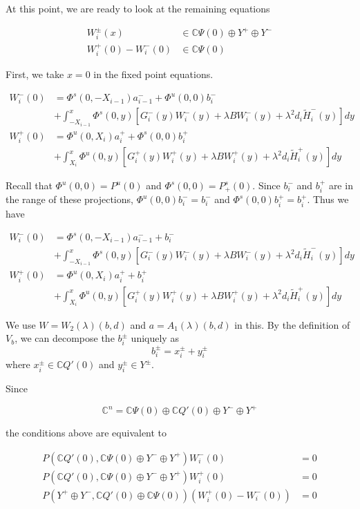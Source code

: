 \documentclass[12pt]{article}
\def\C{{\mathbb C}}
\begin{document}
At this point, we are ready to look at the remaining equations

\begin{align*}
W_i^\pm(x) &\in \C \Psi(0) \oplus Y^+ \oplus Y^- \\
W_i^+(0) - W_i^-(0) &\in \C \Psi(0) 
\end{align*}

First, we take $x = 0$ in the fixed point equations.

\begin{align*}
W_i^-(0) &= \Phi^s(0, -X_{i-1})a^-_{i-1} + \Phi^u(0, 0)b_i^- \\
&+ \int_{-X_{i-1}}^x \Phi^s(0, y)[G_i^-(y) W_i^-(y) + \lambda B W_i^-(y) + \lambda^2 d_i \tilde{H}_i^-(y)] dy \\
W_i^+(0) &= \Phi^u(0, X_i)a^+_{i} + \Phi^s(0, 0)b_i^+ \\
&+ \int_{X_{i}}^x \Phi^u(0, y)[G_i^+(y) W_i^+(y) + \lambda B W_i^+(y) + \lambda^2 d_i \tilde{H}_i^+(y) ] dy
\end{align*}

Recall that $\Phi^u(0, 0) = P^u(0)$ and $\Phi^s(0, 0) = P^s_+(0)$. Since $b_i^-$ and $b_i^+$ are in the range of these projections, $\Phi^u(0, 0)b_i^- = b_i^-$ and $\Phi^s(0, 0)b_i^+ = b_i^+ $. Thus we have

\begin{align*}
W_i^-(0) &= \Phi^s(0, -X_{i-1})a^-_{i-1} + b_i^- \\
&+ \int_{-X_{i-1}}^x \Phi^s(0, y)[G_i^-(y) W_i^-(y) + \lambda B W_i^-(y) + \lambda^2 d_i \tilde{H}_i^-(y)] dy \\
W_i^+(0) &= \Phi^u(0, X_i)a^+_{i} + b_i^+ \\
&+ \int_{X_{i}}^x \Phi^u(0, y)[G_i^+(y) W_i^+(y) + \lambda B W_i^+(y) + \lambda^2 d_i \tilde{H}_i^+(y) ] dy
\end{align*}

We use $W = W_2(\lambda)(b,d)$ and $a = A_1(\lambda)(b,d)$ in this. By the definition of $V_b$, we can decompose the $b_i^\pm$ uniquely as
\[
b_i^\pm = x_i^\pm + y_i^\pm
\]
where $x_i^\pm \in \C Q'(0)$ and $y_i^\pm \in Y^\pm$. 

Since

\[
\C^n = \C\Psi(0) \oplus \C Q'(0) \oplus Y^- \oplus Y^+
\]

the conditions above are equivalent to

\begin{align*}\label{projeq}
P(\C Q'(0), \C\Psi(0) \oplus Y^- \oplus Y^+)W_i^-(0) &= 0 \\
P(\C Q'(0), \C\Psi(0) \oplus Y^- \oplus Y^+)W_i^+(0) &= 0 \\
P(Y^+ \oplus Y^-, \C Q'(0) \oplus \C\Psi(0) )(W_i^+(0) - W_i^-(0)) &= 0 \\
\end{align*}
\end{document}
